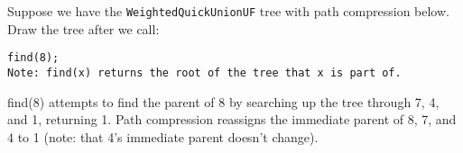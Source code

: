 \question Suppose we have the \texttt{WeightedQuickUnionUF} tree with path compression below. Draw the tree after we call: 

\begin{lstlisting} 
find(8);
Note: find(x) returns the root of the tree that x is part of.
\end{lstlisting}


\begin{center}
\end{center}




\begin{solution}[1in]
\begin{center}
\end{center}

find(8) attempts to find the parent of 8 by searching up the tree through 7, 4, and 1, returning 1. Path compression reassigns the immediate parent of 8, 7, and 4 to 1 (note: that 4's immediate parent doesn't change).
\end{solution}
